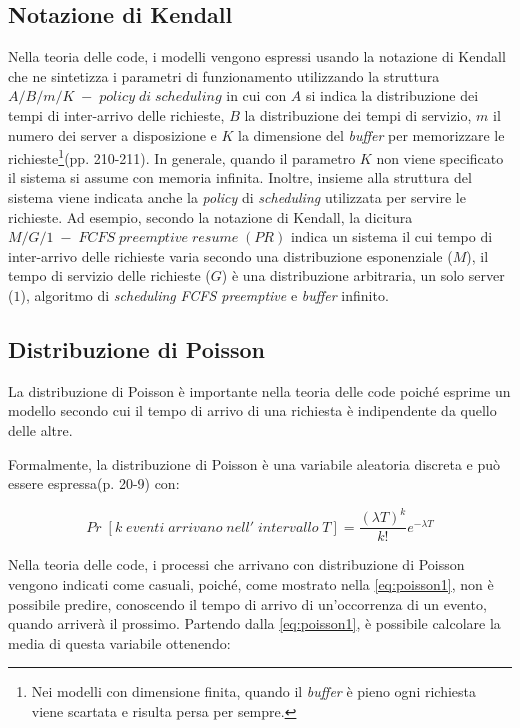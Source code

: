 \subsection{Notazione di Kendall}
Nella teoria delle code, i modelli vengono espressi usando la notazione di Kendall\cite{bolch2006queueing} che ne sintetizza i parametri di funzionamento utilizzando la struttura $A/B/m/K\;-\;policy\;di\;scheduling$ in cui con $A$ si indica la distribuzione dei tempi di inter-arrivo delle richieste, $B$ la distribuzione dei tempi di servizio, $m$ il numero dei server a disposizione e $K$ la dimensione del \textit{buffer} per memorizzare le richieste\footnote{Nei modelli con dimensione finita, quando il \textit{buffer} è pieno ogni richiesta viene scartata e risulta persa per sempre.}\cite{bolch2006queueing}(pp. 210-211). In generale, quando il parametro $K$ non viene specificato il sistema si assume con memoria infinita. Inoltre, insieme alla struttura del sistema viene indicata anche la \textit{policy} di \textit{scheduling} utilizzata per servire le richieste. Ad esempio, secondo la notazione di Kendall, la dicitura $M/G/1\;-\;FCFS\;preemptive\;resume\;(PR)$ indica un sistema il cui tempo di inter-arrivo delle richieste varia secondo una distribuzione esponenziale ($M$), il tempo di servizio delle richieste ($G$) è una distribuzione arbitraria, un solo server ($1$), algoritmo di \textit{scheduling} \textit{FCFS preemptive} e \textit{buffer} infinito.

\subsection{Distribuzione di Poisson}\label{poisson}
La distribuzione di Poisson è importante nella teoria delle code poiché esprime un modello secondo cui il tempo di arrivo di una richiesta è indipendente da quello delle altre.

Formalmente, la distribuzione di Poisson è una variabile aleatoria discreta e può essere espressa\cite{stallingsos}(p. 20-9) con:

\begin{equation}
    Pr\;[k\;eventi\;arrivano\;nell'\;intervallo\;T] = \frac{(\lambda T)^k}{k!} e^{-\lambda T}
    \label{eq:poisson1}
\end{equation}

Nella teoria delle code, i processi che arrivano con distribuzione di Poisson vengono indicati come casuali, poiché, come mostrato nella \cref{eq:poisson1}, non è possibile predire, conoscendo il tempo di arrivo di un'occorrenza di un evento, quando arriverà il prossimo. Partendo dalla \cref{eq:poisson1}, è possibile calcolare la media di questa variabile ottenendo:

